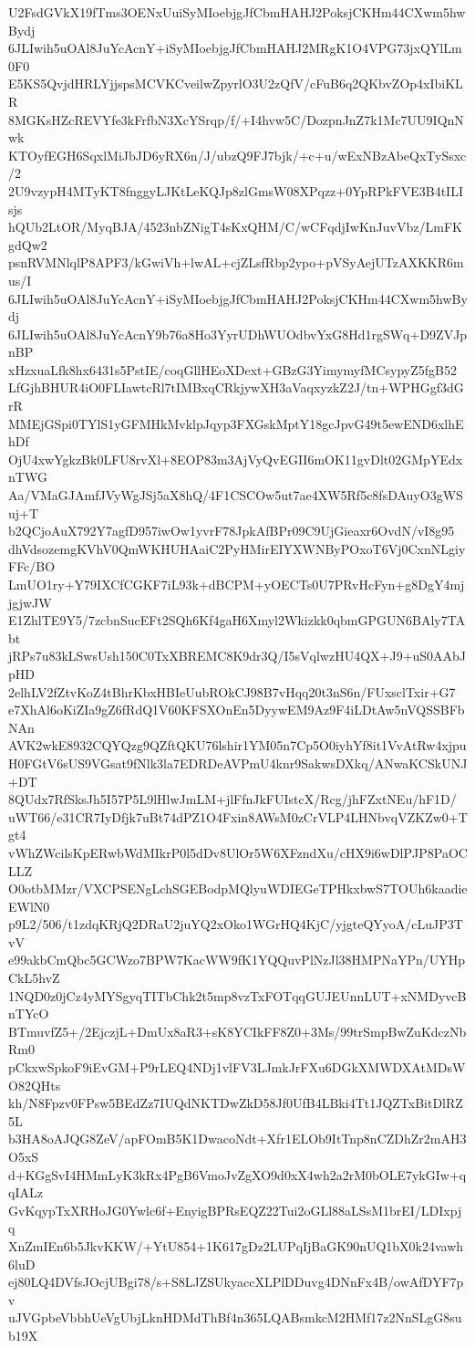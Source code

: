 U2FsdGVkX19fTms3OENxUuiSyMIoebjgJfCbmHAHJ2PoksjCKHm44CXwm5hwBydj
6JLIwih5uOAl8JuYcAcnY+iSyMIoebjgJfCbmHAHJ2MRgK1O4VPG73jxQYlLm0F0
E5KS5QvjdHRLYjjspsMCVKCveilwZpyrlO3U2zQfV/cFuB6q2QKbvZOp4xIbiKLR
8MGKsHZcREVYfe3kFrfbN3XcYSrqp/f/+I4hvw5C/DozpnJnZ7k1Mc7UU9IQnNwk
KTOyfEGH6SqxlMiJbJD6yRX6n/J/ubzQ9FJ7bjk/+c+u/wExNBzAbeQxTySsxc/2
2U9vzypH4MTyKT8fnggyLJKtLeKQJp8zlGmsW08XPqzz+0YpRPkFVE3B4tILIsjs
hQUb2LtOR/MyqBJA/4523nbZNigT4sKxQHM/C/wCFqdjIwKnJuvVbz/LmFKgdQw2
psnRVMNlqlP8APF3/kGwiVh+lwAL+cjZLsfRbp2ypo+pVSyAejUTzAXKKR6mus/I
6JLIwih5uOAl8JuYcAcnY+iSyMIoebjgJfCbmHAHJ2PoksjCKHm44CXwm5hwBydj
6JLIwih5uOAl8JuYcAcnY9b76a8Ho3YyrUDhWUOdbvYxG8Hd1rgSWq+D9ZVJpnBP
xHzxuaLfk8hx6431s5PstIE/coqGllHEoXDext+GBzG3YimymyfMCsypyZ5fgB52
LfGjhBHUR4iO0FLIawtcRl7tIMBxqCRkjywXH3aVaqxyzkZ2J/tn+WPHGgf3dGrR
MMEjGSpi0TYlS1yGFMHkMvklpJqyp3FXGskMptY18gcJpvG49t5ewEND6xlhEhDf
OjU4xwYgkzBk0LFU8rvXl+8EOP83m3AjVyQvEGII6mOK11gvDlt02GMpYEdxnTWG
Aa/VMaGJAmfJVyWgJSj5aX8hQ/4F1CSCOw5ut7ae4XW5Rf5c8fsDAuyO3gWSuj+T
b2QCjoAuX792Y7agfD957iwOw1yvrF78JpkAfBPr09C9UjGieaxr6OvdN/vI8g95
dhVdsozemgKVhV0QmWKHUHAaiC2PyHMirEIYXWNByPOxoT6Vj0CxnNLgiyFFc/BO
LmUO1ry+Y79IXCfCGKF7iL93k+dBCPM+yOECTs0U7PRvHcFyn+g8DgY4mjjgjwJW
E1ZhlTE9Y5/7zcbnSucEFt2SQh6Kf4gaH6Xmyl2Wkizkk0qbmGPGUN6BAly7TAbt
jRPs7u83kLSwsUsh150C0TxXBREMC8K9dr3Q/I5sVqlwzHU4QX+J9+uS0AAbJpHD
2elhLV2fZtvKoZ4tBhrKbxHBIeUubROkCJ98B7vHqq20t3nS6n/FUxsclTxir+G7
e7XhAl6oKiZIa9gZ6fRdQ1V60KFSXOnEn5DyywEM9Az9F4iLDtAw5nVQSSBFbNAn
AVK2wkE8932CQYQzg9QZftQKU76lshir1YM05n7Cp5O0iyhYf8it1VvAtRw4xjpu
H0FGtV6sUS9VGsat9fNlk3la7EDRDeAVPmU4knr9SakwsDXkq/ANwaKCSkUNJ+DT
8QUdx7RfSksJh5I57P5L9lHlwJmLM+jlFfnJkFUIstcX/Rcg/jhFZxtNEu/hF1D/
uWT66/e31CR7IyDfjk7uBt74dPZ1O4Fxin8AWsM0zCrVLP4LHNbvqVZKZw0+Tgt4
vWhZWcilsKpERwbWdMIkrP0l5dDv8UlOr5W6XFzndXu/cHX9i6wDlPJP8PaOCLLZ
O0otbMMzr/VXCPSENgLchSGEBodpMQlyuWDIEGeTPHkxbwS7TOUh6kaadieEWlN0
p9L2/506/t1zdqKRjQ2DRaU2juYQ2xOko1WGrHQ4KjC/yjgteQYyoA/cLuJP3TvV
e99akbCmQbc5GCWzo7BPW7KacWW9fK1YQQuvPlNzJl38HMPNaYPn/UYHpCkL5hvZ
1NQD0z0jCz4yMYSgyqTITbChk2t5mp8vzTxFOTqqGUJEUnnLUT+xNMDyvcBnTYcO
BTmuvfZ5+/2EjczjL+DmUx8aR3+sK8YCIkFF8Z0+3Ms/99trSmpBwZuKdczNbRm0
pCkxwSpkoF9iEvGM+P9rLEQ4NDj1vlFV3LJmkJrFXu6DGkXMWDXAtMDsWO82QHts
kh/N8Fpzv0FPsw5BEdZz7IUQdNKTDwZkD58Jf0UfB4LBki4Tt1JQZTxBitDlRZ5L
b3HA8oAJQG8ZeV/apFOmB5K1DwacoNdt+Xfr1ELOb9ItTnp8nCZDhZr2mAH3O5xS
d+KGgSvI4HMmLyK3kRx4PgB6VmoJvZgXO9d0xX4wh2a2rM0bOLE7ykGIw+qqIALz
GvKqypTxXRHoJG0Ywlc6f+EnyigBPRsEQZ22Tui2oGLl88aLSsM1brEI/LDIxpjq
XnZmIEn6b5JkvKKW/+YtU854+1K617gDz2LUPqIjBaGK90nUQ1bX0k24vawh6luD
ej80LQ4DVfsJOcjUBgi78/s+S8LJZSUkyaccXLPlDDuvg4DNnFx4B/owAfDYF7pv
uJVGpbeVbbhUeVgUbjLknHDMdThBf4n365LQABsmkcM2HMf17z2NnSLgG8sub19X
